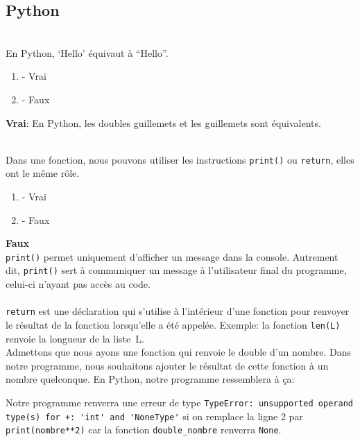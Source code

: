\subsection{Python}

\begin{Exercice}[2 minutes]\\
En Python, `Hello' équivaut à ``Hello''. 

\begin{enumerate}
    \item - Vrai
    \item - Faux
\end{enumerate}
\begin{solution}
    \textbf{Vrai}: En Python, les doubles guillemets et les guillemets sont équivalents. 
\end{solution}
\end{Exercice}


\begin{Exercice}[2 minutes]\\
Dans une fonction, nous pouvons utiliser les instructions \lstinline{print()} ou \lstinline{return}, elles ont le même rôle.
\begin{enumerate}
    \item - Vrai
    \item - Faux
\end{enumerate}
\begin{solution}
    \textbf{Faux}\\
    \lstinline{print()} permet uniquement d'afficher un message dans la console. Autrement dit, \lstinline{print()} sert à communiquer un message à l'utilisateur final du programme, celui-ci n'ayant pas accès au code.\\\\
    \lstinline{return} est une déclaration qui s'utilise à l'intérieur d'une fonction pour renvoyer le résultat de la fonction lorsqu'elle a été appelée. Exemple: la fonction \lstinline{len(L)} renvoie la longueur de la liste~L.\\

    Admettons que nous ayons une fonction qui renvoie le double d'un nombre. Dans notre programme, nous souhaitons ajouter le résultat de cette fonction à un nombre quelconque.
    En Python, notre programme ressemblera à ça:
    

    Notre programme renverra une erreur de type \lstinline{TypeError: unsupported operand type(s) for +: 'int' and 'NoneType'} si on remplace la ligne 2 par \lstinline{print(nombre**2)} car la fonction \lstinline{double_nombre} renverra \lstinline{None}.
\end{solution}
\end{Exercice}


